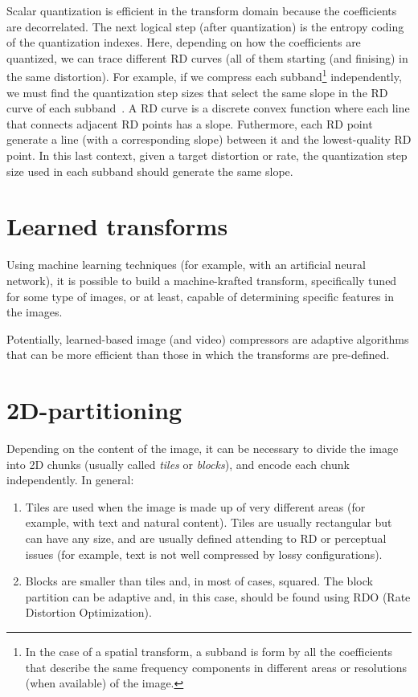 Scalar quantization is efficient in the transform domain because the
coefficients are decorrelated. The next logical step (after
quantization) is the entropy coding of the quantization indexes. Here,
depending on how the coefficients are quantized, we can trace
different RD curves (all of them starting (and finising) in the same
distortion). For example, if we compress each subband\footnote{In the
  case of a spatial transform, a subband is form by all the
  coefficients that describe the same frequency components in
  different areas or resolutions (when available) of the image.}
independently, we must find the quantization step sizes that select
the same slope in the RD curve of each
subband~\cite{vruiz__information_theory}. A RD curve is a discrete
convex function where each line that connects adjacent RD points has a
slope. Futhermore, each RD point generate a line (with a corresponding
slope) between it and the lowest-quality RD point. In this last
context, given a target distortion or rate, the quantization step size
used in each subband should generate the same slope.


\section{Learned transforms}

Using machine learning techniques (for example, with an artificial
neural network), it is possible to build a machine-krafted transform,
specifically tuned for some type of images, or at least, capable of
determining specific features in the images.

Potentially, learned-based image (and video) compressors are adaptive
algorithms that can be more efficient than those in which the
transforms are pre-defined.


\section{2D-partitioning}

Depending on the content of the image, it can be necessary to divide
the image into 2D chunks (usually called \emph{tiles} or
\emph{blocks}), and encode each chunk independently. In general:
\begin{enumerate}
\item Tiles are used when the image is made up of very different areas
  (for example, with text and natural content). Tiles are usually
  rectangular but can have any size, and are usually defined attending
  to RD or perceptual issues (for example, text is not well compressed by
  lossy configurations).
\item Blocks are smaller than tiles and, in most of cases,
  squared. The block partition can be adaptive and, in this case,
  should be found using RDO (Rate Distortion Optimization).
\end{enumerate}

